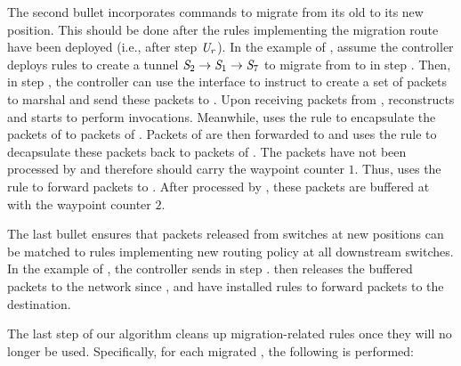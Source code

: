 The second bullet incorporates commands to migrate \nfID{\nfIdx} from its old to its new
position. This should be done after the rules implementing the
migration route have been deployed (i.e., after step
$\mathit{U}_{\mathit{r}}$). 
In the example of , assume the controller deploys rules to create a tunnel $\switchID{2} \rightarrow \switchID{1} \rightarrow \switchID{7}$ to migrate  from  to  in step . Then, in step , the controller can use the interface  to instruct  to create a set of packets to marshal  and send these packets to . Upon receiving packets from ,  reconstructs  and starts to perform  invocations. Meanwhile,  uses the rule  to encapsulate the packets of \flowID{} to packets of . Packets of  are then forwarded to  and  uses the rule  to decapsulate these packets back to packets of \flowID{}. The packets have not been processed by  and therefore should carry the waypoint counter $1$. Thus,  uses the rule  to forward packets to . After processed by , these packets are buffered at  with the waypoint counter $2$.

The last bullet ensures that packets
released from switches at new positions can be matched to rules
implementing new routing policy at all downstream switches.
In the example of , the controller sends  in step .  then releases the buffered packets to the network since ,  and  have installed rules to forward packets to the destination.

The last step of our algorithm cleans up migration-related rules once
they will no longer be used.  Specifically, for each migrated
\nfID{\nfIdx}, the following is performed:

\hspace*{-\parindent}

